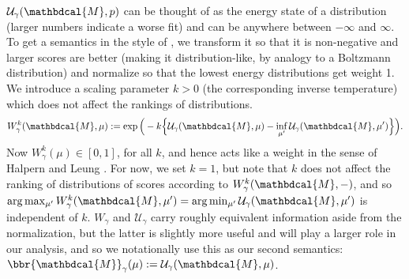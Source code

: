 \documentclass{article}
\theoremstyle{plain}
\theoremstyle{definition}
\theoremstyle{remark}
\newcommand{\dg}[1]{\mathbdcal{#1}}
\numberwithin{equation}{section}
\begin{document}
{$\mathcal U_\gamma(\dg M, p)$ can be thought of as the energy state of
        a distribution (larger numbers indicate a worse fit) and can
        be anywhere between $-\infty$ and $\infty$.
        To get a semantics in the style of \cite{halpern2015weighted},
        we transform it so that it is non-negative and larger scores
        are better (making it distribution-like, by analogy to a
        Boltzmann distribution) and normalize so that the lowest
        energy distributions get weight 1. We introduce a scaling
        parameter $k > 0$ (the corresponding inverse temperature)
       which does not affect the rankings of distributions. 
       \[ W^k_\gamma(\dg M, \mu) := \exp\Big(  -k \Big\{\mathcal U_{\gamma}(\dg M,\mu)- \inf_{\mu'} \mathcal U_\gamma(\dg M,\mu')\Big\} \Big).\]
Now 
$W^k_\gamma(\mu) \in  [0,1]$, for all $k$, and hence acts like a weight in the sense of  Halpern and Leung \citeyear{halpern2015weighted}.
For now, we set $k=1$, but note that $k$ does not affect the ranking of distributions of scores according to $W^k_\gamma(\dg M, -)$, and so $\arg\max_{\mu'} W^k_\gamma(\dg M, \mu')  = \arg\min_{\mu'} \mathcal U_\gamma(\dg M,\mu')$ is independent of $k$. 
%
$W_\gamma$ and $\mathcal U_\gamma$ carry roughly equivalent information aside from the normalization, but the latter is slightly more useful and will play a larger role in our analysis, and so we notationally use this as our second semantics: $\bbr{\dg M}_\gamma(\mu) := \mathcal U_\gamma(\dg M, \mu)$.
}
\end{document}
